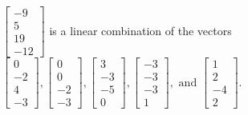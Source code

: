 \begin{exercise}
\begin{exerciseStatement}
  \end{exerciseStatement}
  \begin{exerciseAnswer}
   \(\left[\begin{array}{c}
-9 \\
5 \\
19 \\
-12
\end{array}\right]\) 
  	 is  
	a linear combination of the vectors \(\left[\begin{array}{c}
0 \\
-2 \\
4 \\
-3
\end{array}\right] , \left[\begin{array}{c}
0 \\
0 \\
-2 \\
-3
\end{array}\right] , \left[\begin{array}{c}
3 \\
-3 \\
-5 \\
0
\end{array}\right] , \left[\begin{array}{c}
-3 \\
-3 \\
-3 \\
1
\end{array}\right] , \text{ and } \left[\begin{array}{c}
1 \\
2 \\
-4 \\
2
\end{array}\right]\).

	
  


  \end{exerciseAnswer}
\end{exercise}